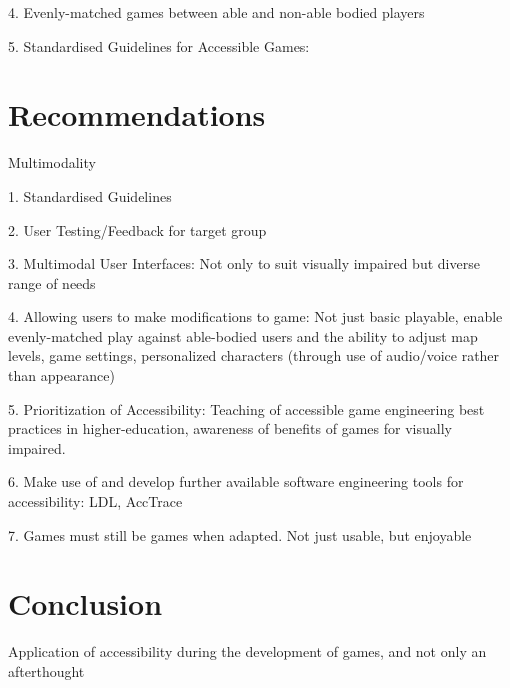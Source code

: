 \documentclass{scrartcl}
\begin{document}
4.	Evenly-matched games between able and non-able bodied players

5.	Standardised Guidelines for Accessible Games:

\section{Recommendations}

Multimodality

1.	Standardised Guidelines

2.	User Testing/Feedback for target group

3.	Multimodal User Interfaces: Not only to suit visually impaired but diverse range of needs

4.	Allowing users to make modifications to game: Not just basic playable, enable evenly-matched play against able-bodied users and the ability to adjust map levels, game settings, personalized characters (through use of audio/voice rather than appearance)

5.	Prioritization of Accessibility: Teaching of accessible game engineering best practices in higher-education, awareness of benefits of games for visually impaired.

6.	Make use of and develop further available software engineering tools for accessibility: LDL, AccTrace

7.	Games must still be games when adapted. Not just usable, but enjoyable

\section{Conclusion}

Application of accessibility during the development of games, and not only an afterthought




\end{document}
